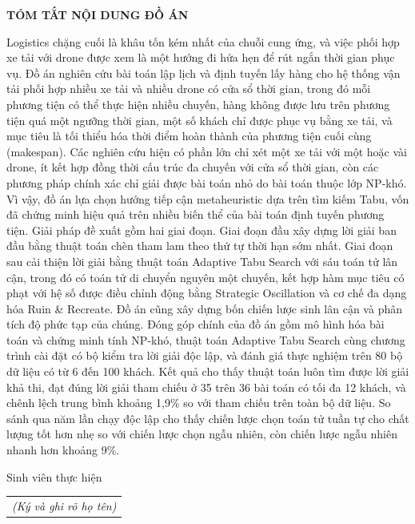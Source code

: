 \documentclass[../DoAn.tex]{subfiles}
\begin{document}
\begin{center}
    \Large{\textbf{TÓM TẮT NỘI DUNG ĐỒ ÁN}}\\
\end{center}
\vspace{1cm}
Logistics chặng cuối là khâu tốn kém nhất của chuỗi cung ứng, và việc phối hợp xe tải với drone được xem là một hướng đi hứa hẹn để rút ngắn thời gian phục vụ. Đồ án nghiên cứu bài toán lập lịch và định tuyến lấy hàng cho hệ thống vận tải phối hợp nhiều xe tải và nhiều drone có cửa sổ thời gian, trong đó mỗi phương tiện có thể thực hiện nhiều chuyến, hàng không được lưu trên phương tiện quá một ngưỡng thời gian, một số khách chỉ được phục vụ bằng xe tải, và mục tiêu là tối thiểu hóa thời điểm hoàn thành của phương tiện cuối cùng (makespan). Các nghiên cứu hiện có phần lớn chỉ xét một xe tải với một hoặc vài drone, ít kết hợp đồng thời cấu trúc đa chuyến với cửa sổ thời gian, còn các phương pháp chính xác chỉ giải được bài toán nhỏ do bài toán thuộc lớp NP-khó. Vì vậy, đồ án lựa chọn hướng tiếp cận metaheuristic dựa trên tìm kiếm Tabu, vốn đã chứng minh hiệu quả trên nhiều biến thể của bài toán định tuyến phương tiện. Giải pháp đề xuất gồm hai giai đoạn. Giai đoạn đầu xây dựng lời giải ban đầu bằng thuật toán chèn tham lam theo thứ tự thời hạn sớm nhất. Giai đoạn sau cải thiện lời giải bằng thuật toán Adaptive Tabu Search với sáu toán tử lân cận, trong đó có toán tử di chuyển nguyên một chuyến, kết hợp hàm mục tiêu có phạt với hệ số được điều chỉnh động bằng Strategic Oscillation và cơ chế đa dạng hóa Ruin \& Recreate. Đồ án cũng xây dựng bốn chiến lược sinh lân cận và phân tích độ phức tạp của chúng. Đóng góp chính của đồ án gồm mô hình hóa bài toán và chứng minh tính NP-khó, thuật toán Adaptive Tabu Search cùng chương trình cài đặt có bộ kiểm tra lời giải độc lập, và đánh giá thực nghiệm trên 80 bộ dữ liệu có từ 6 đến 100 khách. Kết quả cho thấy thuật toán luôn tìm được lời giải khả thi, đạt đúng lời giải tham chiếu ở 35 trên 36 bài toán có tối đa 12 khách, và chênh lệch trung bình khoảng 1,9\% so với tham chiếu trên toàn bộ dữ liệu. So sánh qua năm lần chạy độc lập cho thấy chiến lược chọn toán tử tuần tự cho chất lượng tốt hơn nhẹ so với chiến lược chọn ngẫu nhiên, còn chiến lược ngẫu nhiên nhanh hơn khoảng 9\%.

\begin{flushright}
Sinh viên thực hiện\\
\begin{tabular}{@{}c@{}}
\textit{(Ký và ghi rõ họ tên)}
\end{tabular}
\end{flushright}
\end{document}
